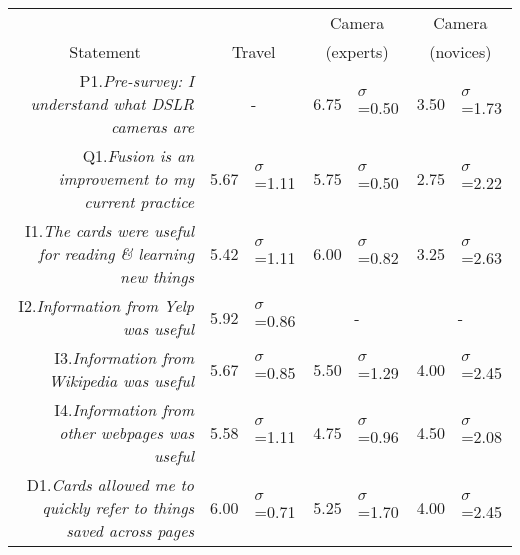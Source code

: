 \begin{table}
  \centering
  \scriptsize

  \begin{tabular}{ r  r l |  r l |  r l }
    \hline
	&
	\multicolumn{2}{c}{} &
	\multicolumn{2}{c}{Camera} &
	\multicolumn{2}{c}{Camera} \\
	
	\multicolumn{1}{c}{Statement} &
	\multicolumn{2}{c}{Travel} &
	\multicolumn{2}{c}{(experts)} &
	\multicolumn{2}{c}{(novices)} \\
	
    
	\hline
	
	\multicolumn{1}{p{0.54\columnwidth}}{P1.\textit{Pre-survey: I understand what DSLR cameras are}} &
	\multicolumn{2}{c|}{-} &
    6.75 & $\sigma$=0.50 &
    3.50 & $\sigma$=1.73 \\
    
	\hline
	
    
	\multicolumn{1}{p{0.54\columnwidth}}{Q1.\textit{Fusion is an improvement to my current practice}} &
    5.67  & $\sigma$=1.11 &
    5.75 & $\sigma$=0.50 &
    2.75 & $\sigma$=2.22 \\
    
	\multicolumn{1}{p{0.54\columnwidth}}{I1.\textit{The cards were useful for reading \& learning new things}} &
    5.42 & $\sigma$=1.11 &
    6.00 & $\sigma$=0.82 &
    3.25 & $\sigma$=2.63 \\
    
	\multicolumn{1}{p{0.54\columnwidth}}{I2.\textit{Information from Yelp was useful
}} &
    5.92 & $\sigma$=0.86 &
	\multicolumn{2}{c|}{-} &
	\multicolumn{2}{c}{-} \\
    
	\multicolumn{1}{p{0.54\columnwidth}}{I3.\textit{Information from Wikipedia was useful}} &
    5.67 & $\sigma$=0.85 &
    5.50 & $\sigma$=1.29 &
    4.00 & $\sigma$=2.45 \\
    
	\multicolumn{1}{p{0.54\columnwidth}}{I4.\textit{Information from other webpages was useful}} &
    5.58 & $\sigma$=1.11 &
    4.75 & $\sigma$=0.96 &
    4.50 & $\sigma$=2.08 \\
    
    
	\multicolumn{1}{p{0.54\columnwidth}}{D1.\textit{Cards allowed me to quickly refer to things saved across pages}} &
    6.00 & $\sigma$=0.71 &
    5.25 & $\sigma$=1.70 &
    4.00 & $\sigma$=2.45 \\
    

\end{tabular}
\end{table}
